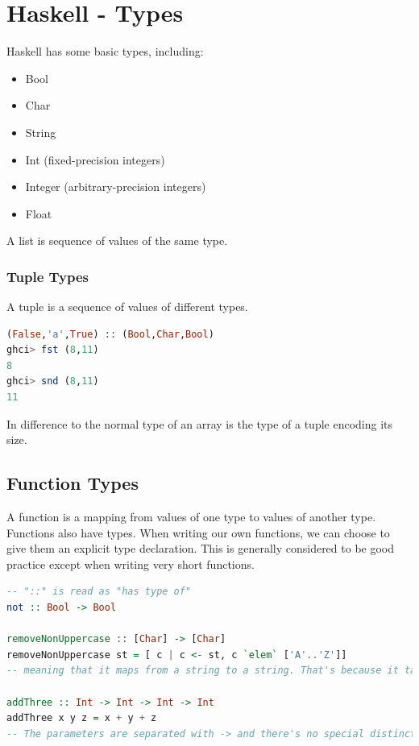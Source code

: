 \hypertarget{haskell}{%
\section{Haskell - Types}\label{haskell}}

Haskell has some basic types, including:

\begin{itemize}
\tightlist
\item
  Bool
\item
  Char
\item
  String
\item
  Int (fixed-precision integers)
\item
  Integer (arbitrary-precision integers)
\item
  Float
\end{itemize}

A list is sequence of values of the same type.

\hypertarget{tuple-types}{%
\subsubsection{Tuple Types}\label{tuple-types}}

A tuple is a sequence of values of different types.

\begin{lstlisting}[language=Haskell]
(False,'a',True) :: (Bool,Char,Bool)
ghci> fst (8,11)  
8  
ghci> snd (8,11)
11
\end{lstlisting}

In difference to the normal type of an array is the type of a tuple
encoding its size.

\hypertarget{function-types}{%
\subsection{Function Types}\label{function-types}}

A function is a mapping from values of one type to values of another type. Functions also have types. When writing our own functions, we can choose to give them an explicit type declaration. This is generally considered to be good practice except when writing very short functions.

\begin{lstlisting}[language=Haskell]
-- "::" is read as "has type of"
not :: Bool -> Bool

removeNonUppercase :: [Char] -> [Char]  
removeNonUppercase st = [ c | c <- st, c `elem` ['A'..'Z']]  
-- meaning that it maps from a string to a string. That's because it takes one string as a parameter and returns another as a result

addThree :: Int -> Int -> Int -> Int  
addThree x y z = x + y + z 
-- The parameters are separated with -> and there's no special distinction between the parameters and the return type.
\end{lstlisting}

